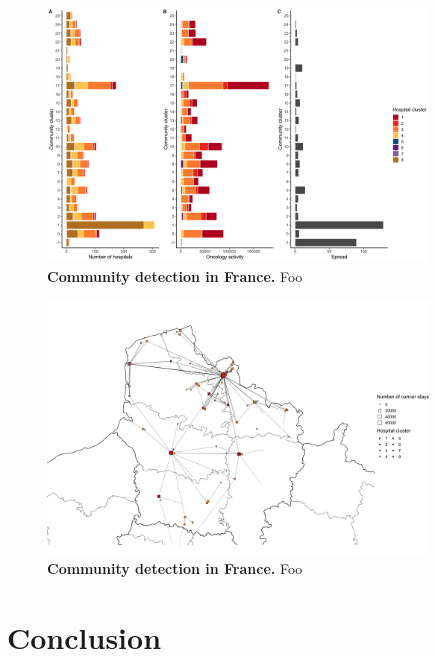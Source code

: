 \begin{figure}[h!]
    \includegraphics[width=0.9\textwidth]{images/co-occurrences/fig3.png}
    \centering
    \caption{ \textbf{Community detection in France.} Foo }
    \label{fig:co-occ-description}
\end{figure}

\begin{figure}[h!]
    \includegraphics[width=0.9\textwidth]{images/co-occurrences/fig2.png}
    \centering
    \caption{ \textbf{Community detection in France.} Foo }
    \label{fig:co-occ-cluster}
\end{figure}

\section{Conclusion}

